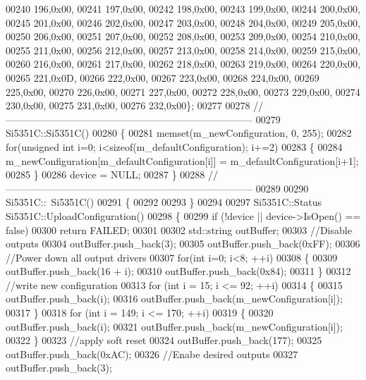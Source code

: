 \begin{DoxyCode}
00240 196,0x00,
00241 197,0x00,
00242 198,0x00,
00243 199,0x00,
00244 200,0x00,
00245 201,0x00,
00246 202,0x00,
00247 203,0x00,
00248 204,0x00,
00249 205,0x00,
00250 206,0x00,
00251 207,0x00,
00252 208,0x00,
00253 209,0x00,
00254 210,0x00,
00255 211,0x00,
00256 212,0x00,
00257 213,0x00,
00258 214,0x00,
00259 215,0x00,
00260 216,0x00,
00261 217,0x00,
00262 218,0x00,
00263 219,0x00,
00264 220,0x00,
00265 221,0x0D,
00266 222,0x00,
00267 223,0x00,
00268 224,0x00,
00269 225,0x00,
00270 226,0x00,
00271 227,0x00,
00272 228,0x00,
00273 229,0x00,
00274 230,0x00,
00275 231,0x00,
00276 232,0x00\};
00277 
00278 \textcolor{comment}{// ---------------------------------------------------------------------------}
00279 Si5351C::Si5351C()
00280 \{
00281     memset(m\_newConfiguration, 0, 255);
00282     \textcolor{keywordflow}{for}(\textcolor{keywordtype}{unsigned} \textcolor{keywordtype}{int} i=0; i<\textcolor{keyword}{sizeof}(m\_defaultConfiguration); i+=2)
00283     \{
00284         m\_newConfiguration[m\_defaultConfiguration[i]] = m\_defaultConfiguration[i+1];
00285     \}
00286     device = NULL;
00287 \}
00288 \textcolor{comment}{// ---------------------------------------------------------------------------}
00289 
00290 Si5351C::~Si5351C()
00291 \{
00292 
00293 \}
00294 
00297 Si5351C::Status Si5351C::UploadConfiguration()
00298 \{
00299     \textcolor{keywordflow}{if} (!device || device->IsOpen() == \textcolor{keyword}{false})
00300         \textcolor{keywordflow}{return} FAILED;
00301 
00302     std::string outBuffer;
00303     \textcolor{comment}{//Disable outputs}
00304     outBuffer.push\_back(3);
00305     outBuffer.push\_back(0xFF);
00306     \textcolor{comment}{//Power down all output drivers}
00307     \textcolor{keywordflow}{for}(\textcolor{keywordtype}{int} i=0; i<8; ++i)
00308     \{
00309         outBuffer.push\_back(16 + i);
00310         outBuffer.push\_back(0x84);
00311     \}
00312     \textcolor{comment}{//write new configuration}
00313     \textcolor{keywordflow}{for} (\textcolor{keywordtype}{int} i = 15; i <= 92; ++i)
00314     \{
00315         outBuffer.push\_back(i);
00316         outBuffer.push\_back(m\_newConfiguration[i]);
00317     \}
00318     \textcolor{keywordflow}{for} (\textcolor{keywordtype}{int} i = 149; i <= 170; ++i)
00319     \{
00320         outBuffer.push\_back(i);
00321         outBuffer.push\_back(m\_newConfiguration[i]);
00322     \}
00323     \textcolor{comment}{//apply soft reset}
00324     outBuffer.push\_back(177);
00325     outBuffer.push\_back(0xAC);
00326     \textcolor{comment}{//Enabe desired outputs}
00327     outBuffer.push\_back(3);

\end{DoxyCode}
